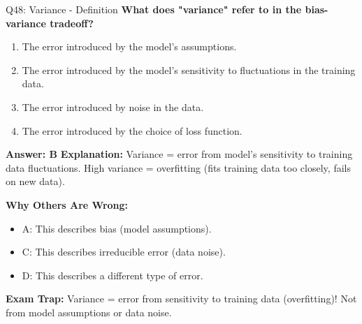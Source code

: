 \documentclass[8pt]{beamer}
\begin{document}
	\begin{frame}{Q48: Variance - Definition}
		\fontsize{6.5}{7.5}\selectfont
		\textbf{What does "variance" refer to in the bias-variance tradeoff?}
		
		\begin{enumerate}
			\item The error introduced by the model's assumptions.
			\item The error introduced by the model's sensitivity to fluctuations in the training data.
			\item The error introduced by noise in the data.
			\item The error introduced by the choice of loss function.
		\end{enumerate}
		
		\vspace{0.05cm}
		\textcolor{myblue}{\textbf{Answer: B}}
		\vspace{0.05cm}
		\textcolor{myblue}{\textbf{Explanation:}} Variance = error from model's sensitivity to training data fluctuations. High variance = overfitting (fits training data too closely, fails on new data).
		
		\vspace{0.05cm}
		\textcolor{myred}{\textbf{Why Others Are Wrong:}}
		\begin{itemize}
			\item \textcolor{myred}{A:} This describes bias (model assumptions).
			\item \textcolor{myred}{C:} This describes irreducible error (data noise).
			\item \textcolor{myred}{D:} This describes a different type of error.
		\end{itemize}
		
		\textcolor{myred}{\textbf{Exam Trap:}} Variance = \textcolor{myblue}{error from sensitivity to training data} (overfitting)! Not from model assumptions or data noise.
	\end{frame}
	
\end{document}
